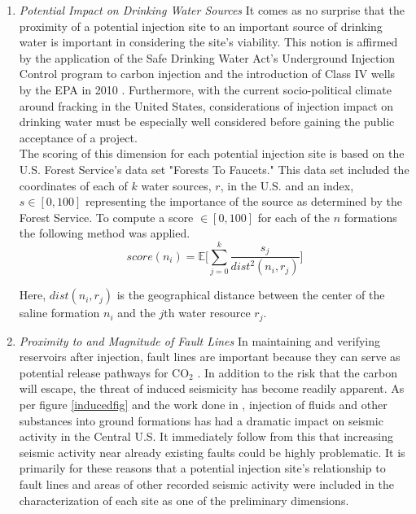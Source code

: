 \documentclass[a4paper, 12pt]{article}
\begin{document}
\begin{enumerate}
\item \emph{Potential Impact on Drinking Water Sources} It comes as no surprise that the proximity of a potential injection site to an important source of drinking water is important in considering the site's viability.  This notion is affirmed by the application of the Safe Drinking Water Act's Underground Injection Control program to carbon injection and the introduction of Class IV wells by the EPA in 2010 \cite{natcarb_risk}. Furthermore, with the current socio-political climate around fracking in the United States, considerations of injection impact on drinking water must be especially well considered before gaining the public acceptance of a project. \\
The scoring of this dimension for each potential injection site is based on the U.S. Forest Service's data set "Forests To Faucets." This data set included the coordinates of each of $k$ water sources, $r$, in the U.S. and an index, $s \in [0, 100]$ representing the importance of the source as determined by the Forest Service. To compute a score $\in [0, 100]$ for each of the $n$ formations the following method was applied. 
$$score(n_i) =  \mathbb{E}\bigg[\sum_{j=0}^k \frac{s_j}{dist^2(n_i, r_j)}\bigg]$$

Here, $dist(n_i, r_j)$ is the geographical distance between the center of the saline formation $n_i$ and the $j$th water resource $r_j$. 

\item \emph{Proximity to and Magnitude of Fault Lines} In maintaining and verifying reservoirs after injection, fault lines are important because they can serve as potential release pathways for CO$_2$ \cite{natcarb_risk}. In addition to the risk that the carbon will escape, the threat of induced seismicity has become readily apparent. As per figure \ref{inducedfig} and the work done in \cite{seis_induced}, injection of fluids and other substances into ground formations has had a dramatic impact on seismic activity in the Central U.S. It immediately follow from this that increasing seismic activity near already existing faults could be highly problematic. It is primarily for these reasons that a potential injection site's relationship to fault lines and areas of other recorded seismic activity were included in the characterization of each site as one of the preliminary dimensions. 


\end{enumerate}
\end{document}
